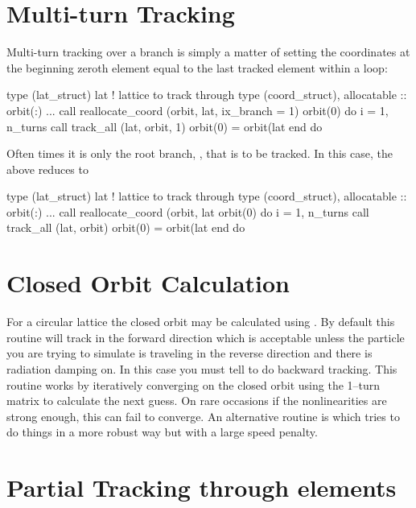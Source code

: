 {{{{{{{{\section{Multi-turn Tracking}

Multi-turn tracking over a branch is simply a matter of
setting the coordinates at the beginning zeroth element equal to the
last tracked element within a loop:
\begin{example}
  type (lat_struct) lat             ! lattice to track through
  type (coord_struct), allocatable :: orbit(:)
  ...
  call reallocate_coord (orbit, lat, ix_branch = 1)
  orbit(0)%
  do i = 1, n_turns
    call track_all (lat, orbit, 1)
    orbit(0) = orbit(lat%
  end do
\end{example}
Often times it is only the root branch, , that is to be tracked.
In this case, the above reduces to
\begin{example}
  type (lat_struct) lat             ! lattice to track through
  type (coord_struct), allocatable :: orbit(:)
  ...
  call reallocate_coord (orbit, lat%
  orbit(0)%
  do i = 1, n_turns
    call track_all (lat, orbit)
    orbit(0) = orbit(lat%
  end do
\end{example}

\section{Closed Orbit Calculation}

For a circular lattice the closed orbit may be calculated using
. By default this routine will track in the
forward direction which is acceptable unless the particle you are
trying to simulate is traveling in the reverse direction and there is
radiation damping on. In this case you must tell
 to do backward tracking. This routine works by
iteratively converging on the closed orbit using the 1--turn matrix to
calculate the next guess. On rare occasions if the nonlinearities are
strong enough, this can fail to converge. An alternative routine is
 which tries to do things in a more
robust way but with a large speed penalty.

\section{Partial Tracking through elements}
\label{s:tracking.partial}

}}}}}}}}
